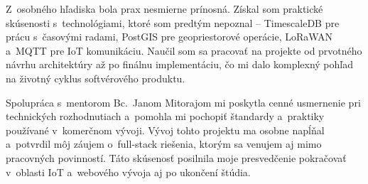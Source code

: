 Z~osobného hľadiska bola prax nesmierne prínosná. Získal som praktické skúsenosti s~technológiami, ktoré som predtým nepoznal -- TimescaleDB pre prácu s~časovými radami, PostGIS pre geopriestorové operácie, LoRaWAN a~MQTT pre IoT komunikáciu. Naučil som sa pracovať na projekte od prvotného návrhu architektúry až po finálnu implementáciu, čo mi dalo komplexný pohľad na životný cyklus softvérového produktu.

Spolupráca s~mentorom Bc.~Janom Mitorajom mi poskytla cenné usmernenie pri technických rozhodnutiach a~pomohla mi pochopiť štandardy a~praktiky používané v~komerčnom vývoji. Vývoj tohto projektu ma osobne napĺňal a~potvrdil môj záujem o~full-stack riešenia, ktorým sa venujem aj mimo pracovných povinností. Táto skúsenosť posilnila moje presvedčenie pokračovať v~oblasti IoT a~webového vývoja aj po ukončení štúdia.

\endinput
